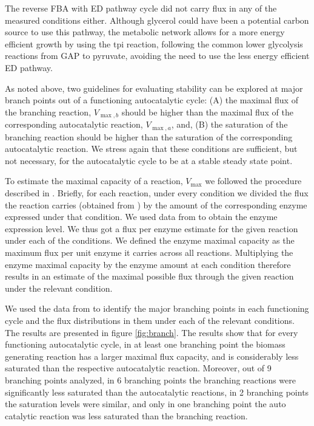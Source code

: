 \documentclass[a4page,notitlepage]{article}
\begin{document}
    The reverse FBA with ED pathway cycle did not carry flux in any of the measured conditions either.
    Although glycerol could have been a potential carbon source to use this pathway, the metabolic network allows for a more energy efficient growth by using the tpi reaction, following the common lower glycolysis reactions from GAP to pyruvate, avoiding the need to use the less energy efficient ED pathway.

    As noted above, two guidelines for evaluating stability can be explored at major branch points out of a functioning autocatalytic cycle: (A) the maximal flux of the branching reaction, $V_{\max,b}$ should be higher than the maximal flux of the corresponding autocatalytic reaction, $V_{\max,a}$, and, (B) the saturation of the branching reaction should be higher than the saturation of the corresponding autocatalytic reaction.
    We stress again that these conditions are sufficient, but not necessary, for the autocatalytic cycle to be at a stable steady state point.

    To estimate the maximal capacity of a reaction, $V_{\max}$ we followed the procedure described in \cite{Davidi2016-ga}.
    Briefly, for each reaction, under every condition we divided the flux the reaction carries (obtained from \cite{Gerosa2015-oq}) by the amount of the corresponding enzyme expressed under that condition.
    We used data from \cite{Schmidt2015} to obtain the enzyme expression level.
    We thus got a flux per enzyme estimate for the given reaction under each of the conditions.
    We defined the enzyme maximal capacity as the maximum flux per unit enzyme it carries across all reactions.
    Multiplying the enzyme maximal capacity by the enzyme amount at each condition therefore results in an estimate of the maximal possible flux through the given reaction under the relevant condition.


    We used the data from \cite{Gerosa2015-oq} to identify the major branching points in each functioning cycle and the flux distributions in them under each of the relevant conditions.
    The results are presented in figure \ref{fig:branch}.
    The results show that for every functioning autocatalytic cycle, in at least one branching point the biomass generating reaction has a larger maximal flux capacity, and is considerably less saturated than the respective autocatalytic reaction.
    Moreover, out of 9 branching points analyzed, in 6 branching points the branching reactions were significantly less saturated than the autocatalytic reactions, in 2 branching points the saturation levels were similar, and only in one branching point the auto catalytic reaction was less saturated than the branching reaction.
\end{document}

